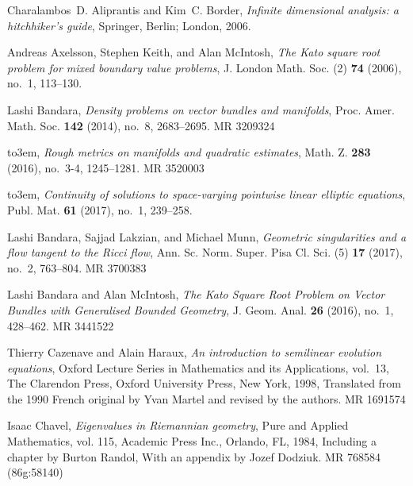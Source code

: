\providecommand{\bysame}{\leavevmode\hbox to3em{\hrulefill}\thinspace}
\providecommand{\MR}{\relax\ifhmode\unskip\space\fi MR }
\providecommand{\MRhref}[2]{%
  \href{http://www.ams.org/mathscinet-getitem?mr=#1}{#2}
}
\providecommand{\href}[2]{#2}
\begin{thebibliography}{AKM06}

Charalambos~D. Aliprantis and Kim~C. Border, \emph{Infinite dimensional
  analysis: a hitchhiker's guide}, Springer, Berlin; London, 2006.

Andreas Axelsson, Stephen Keith, and Alan McIntosh, \emph{The {K}ato square
  root problem for mixed boundary value problems}, J. London Math. Soc. (2)
  \textbf{74} (2006), no.~1, 113--130.

Lashi Bandara, \emph{Density problems on vector bundles and manifolds}, Proc.
  Amer. Math. Soc. \textbf{142} (2014), no.~8, 2683--2695. \MR{3209324}

\bysame, \emph{Rough metrics on manifolds and quadratic estimates}, Math. Z.
  \textbf{283} (2016), no.~3-4, 1245--1281. \MR{3520003}

\bysame, \emph{Continuity of solutions to space-varying pointwise linear
  elliptic equations}, Publ. Mat. \textbf{61} (2017), no.~1, 239--258.

Lashi Bandara, Sajjad Lakzian, and Michael Munn, \emph{Geometric singularities
  and a flow tangent to the {R}icci flow}, Ann. Sc. Norm. Super. Pisa Cl. Sci.
  (5) \textbf{17} (2017), no.~2, 763--804. \MR{3700383}

Lashi Bandara and Alan McIntosh, \emph{The {K}ato {S}quare {R}oot {P}roblem on
  {V}ector {B}undles with {G}eneralised {B}ounded {G}eometry}, J. Geom. Anal.
  \textbf{26} (2016), no.~1, 428--462. \MR{3441522}

Thierry Cazenave and Alain Haraux, \emph{An introduction to semilinear
  evolution equations}, Oxford Lecture Series in Mathematics and its
  Applications, vol.~13, The Clarendon Press, Oxford University Press, New
  York, 1998, Translated from the 1990 French original by Yvan Martel and
  revised by the authors. \MR{1691574}

Isaac Chavel, \emph{Eigenvalues in {R}iemannian geometry}, Pure and Applied
  Mathematics, vol. 115, Academic Press Inc., Orlando, FL, 1984, Including a
  chapter by Burton Randol, With an appendix by Jozef Dodziuk. \MR{768584
  (86g:58140)}


\end{thebibliography}
